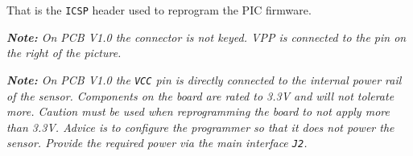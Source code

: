 \begin{multicols}{2}
	That is the \texttt{ICSP} header used to reprogram the PIC firmware.
	
	\textit{\textbf{Note:} On PCB V1.0 the connector is not keyed. VPP is connected to the pin on the right of the picture.}
	
	\textit{\textbf{Note:} On PCB V1.0 the \texttt{VCC} pin is directly connected to the internal power rail of the sensor. Components on the board are rated to 3.3V and will not tolerate more. Caution must be used when reprogramming the board to not apply more than 3.3V. Advice is to configure the programmer so that it does not power the sensor. Provide the required power via the main interface \texttt{J2}.}
	
\end{multicols}